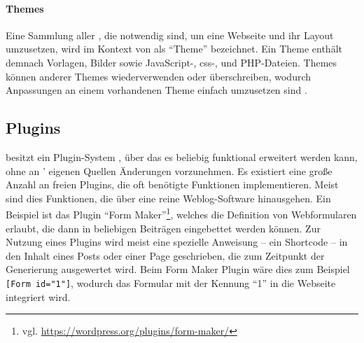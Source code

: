         \paragraph*{Themes}
        Eine Sammlung aller {\resources}, die notwendig sind, um
        eine Webseite und ihr Layout umzusetzen,
        wird im Kontext von {\wordpress} als "`Theme"' bezeichnet.
        Ein Theme enthält demnach Vorlagen, Bilder sowie
        JavaScript-, \gls{css}-, und PHP-Dateien.
        Themes können {\resources} anderer Themes wiederverwenden oder überschreiben,
        wodurch Anpassungen an einem vorhandenen Theme einfach umzusetzen sind
        \cite[Kapitel "`Using Themes"']{wordpress:codex}.

    \subsection{Plugins}
        \label{section:wordpressPlugins}
        {\wordpress} besitzt ein Plugin-System \cite[Kapitel "`Plugins"']{wordpress:codex},
        über das es beliebig funktional erweitert werden kann,
        ohne an {\wordpress}' eigenen Quellen Änderungen vorzunehmen.
        Es existiert eine große Anzahl an freien Plugins,
        die oft benötigte Funktionen implementieren.
        Meist sind dies Funktionen, die über eine reine Weblog-Software hinausgehen.
        Ein Beispiel ist das Plugin
        "`Form Maker"'\footnote{vgl. \url{https://wordpress.org/plugins/form-maker/}},
        welches die Definition von Webformularen erlaubt,
        die dann in beliebigen Beiträgen eingebettet werden können.
        Zur Nutzung eines Plugins wird meist eine spezielle Anweisung -- ein Shortcode \cite[Kapitel "`Shortcode API"']{wordpress:codex} --
        in den Inhalt eines Posts oder einer Page geschrieben,
        die zum Zeitpunkt der Generierung ausgewertet wird.
        Beim Form Maker Plugin wäre dies zum Beispiel \texttt{[Form id="1"]},
        wodurch das Formular mit der Kennung "`1"' in die Webseite integriert wird.
